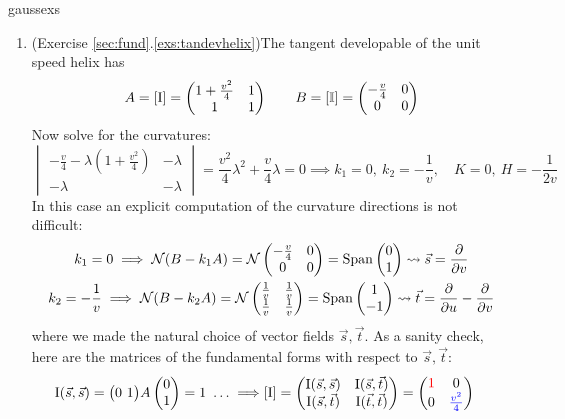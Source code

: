 \begin{examples}{}{gaussexs}
\begin{enumerate}
		\item\label{ex:tandevgauss} (Exercise \ref*{sec:fund}.\ref{exs:tandevhelix})\lstsp The tangent developable of the unit speed helix has	
	  \[
	  	A=[\mathrm{I}]=
	  	\begin{pmatrix}
	  		1+\tfrac{v^2}{4}&1\\
	  		1&1
	  	\end{pmatrix}
	  	\qquad
	  	B=[\mathbb{I}]=
	  	\begin{pmatrix}
	  		-\tfrac{v}{4}&0\\
	  		0&0
	  	\end{pmatrix}
	  \]
	  Now solve for the curvatures:
	  \[
	  	\begin{vmatrix}
	  		-\frac v4-\lambda\left(1+\frac{v^2}4\right)&-\lambda\\
	  		-\lambda&-\lambda
	  	\end{vmatrix}
	  	=\frac{v^2}4\lambda^2+\frac v4\lambda=0
	  	\implies k_1=0,\  k_2=-\frac 1v,\quad K=0,\ H=-\frac 1{2v}
	  \]
	  In this case an explicit computation of the curvature directions is not difficult:
	  \begin{gather*}
	  	k_1=0\implies \mathcal{N}(B-k_1A)=\mathcal{N}
	  	\begin{pmatrix}
	  		-\frac v4&0\\
	  		0&0
	  	\end{pmatrix}
	  	=\operatorname{Span}\begin{pmatrix}0\\1\end{pmatrix} \rightsquigarrow \vec s=\frac{\partial }{\partial v}\\
	  	k_2=-\frac 1v\implies \mathcal{N}(B-k_2A)=\mathcal{N}
	  	\begin{pmatrix}
				\frac 1v&\frac 1v\\
	  		\frac 1v&\frac 1v
	  	\end{pmatrix}
	  	=\operatorname{Span}\begin{pmatrix}1\\-1\end{pmatrix} \rightsquigarrow \vec t=\frac{\partial }{\partial u}-\frac{\partial }{\partial v}
	  \end{gather*}
	  where we made the natural choice of vector fields $\vec s,\vec t$. As a sanity check, here are the matrices of the fundamental forms with respect to $\vec s,\vec t$:
	  \begin{align*}
	  	\I(\vec s,\vec s)=\bigl(0\ 1\bigr)A\twovec 01=1\ \ldots \implies
	  	&[\I]=
	  	\begin{pmatrix}
	  		\I(\vec s,\vec s)&\I(\vec s,\vec t)\\
	  		\I(\vec s,\vec t)&\I(\vec t,\vec t)
			\end{pmatrix}
			=
			\begin{pmatrix}
	  		\textcolor{red}{1}&0\\
	  		0&\textcolor{blue}{\frac{v^2}4}
	  	\end{pmatrix}

\end{align*}
\end{enumerate}
\end{examples}
